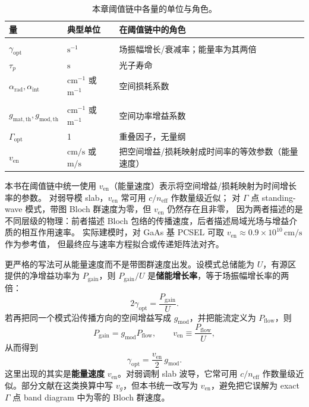 \begin{table}[htbp]
  \centering
  \small
  \caption{本章阈值链中各量的单位与角色。}
  \label{tab:threshold_units_bridge}
  \begin{tabular}{lll}
    \toprule
    量 & 典型单位 & 在阈值链中的角色 \\
    \midrule
    \shortstack[l]{$\gamma_{\mathrm{rad}},\gamma_{\mathrm{int}}$\\$\gamma_{\mathrm{opt}}$} & $\mathrm{s}^{-1}$ & 场振幅增长/衰减率；能量率为其两倍 \\
    $\tau_p$ & $\mathrm{s}$ & 光子寿命 \\
    $\alpha_{\mathrm{rad}},\alpha_{\mathrm{int}}$ & $\mathrm{cm}^{-1}$ 或 $\mathrm{m}^{-1}$ & 空间损耗系数 \\
    \shortstack[l]{$g_{\mathrm{mat}},g_{\mathrm{mod}}$\\$g_{\mathrm{mat,th}},g_{\mathrm{mod,th}}$} & $\mathrm{cm}^{-1}$ 或 $\mathrm{m}^{-1}$ & 空间功率增益系数 \\
    $\Gamma_{\mathrm{opt}}$ & 1 & 重叠因子，无量纲 \\
    $v_{\mathrm{en}}$ & $\mathrm{cm/s}$ 或 $\mathrm{m/s}$ & 把空间增益/损耗映射成时间率的等效参数（能量速度）\\
    \bottomrule
  \end{tabular}
\end{table}

\begin{RigorousBox}
本书在阈值链中统一使用 $v_{\mathrm{en}}$（能量速度）表示将空间增益/损耗映射为时间增长率的参数。
对弱导模 slab，$v_{\mathrm{en}}$ 常可用 $c/n_{\mathrm{eff}}$ 作数量级近似；
对 $\Gamma$ 点 standing-wave 模式，带图 Bloch 群速度为零，但 $v_{\mathrm{en}}$ 仍然存在且非零，
因为两者描述的是不同层级的物理：前者描述 Bloch 包络的传播速度，后者描述局域光场与增益介质的相互作用速率。
实际建模时，对 GaAs 基 PCSEL 可取 $v_{\mathrm{en}}\approx0.9\times10^{10}\,\mathrm{cm/s}$ 作为参考值，
但最终应与速率方程拟合或传递矩阵法对齐。
\end{RigorousBox}

更严格的写法可从能量速度而不是带图群速度出发。设模式总储能为
$U$，有源区提供的净增益功率为 $P_{\mathrm{gain}}$，则 $P_{\mathrm{gain}}/U$ 是\textbf{储能增长率}，等于场振幅增长率的两倍：
\begin{equation}
2\gamma_{\mathrm{opt}}=\frac{P_{\mathrm{gain}}}{U}.
\label{eq:energy_rate_def}
\end{equation}
若再把同一个模式沿传播方向的空间增益写成 $g_{\mathrm{mod}}$，并把能流定义为
$P_{\mathrm{flow}}$，则
\begin{equation}
P_{\mathrm{gain}} = g_{\mathrm{mod}} P_{\mathrm{flow}},
\qquad
v_{\mathrm{en}}\equiv \frac{P_{\mathrm{flow}}}{U},
\label{eq:energy_velocity_def}
\end{equation}
从而得到
\begin{equation}
\gamma_{\mathrm{opt}} = \frac{v_{\mathrm{en}}}{2}\, g_{\mathrm{mod}}.
\label{eq:gamma_from_energy_velocity}
\end{equation}
这里出现的其实是\textbf{能量速度} $v_{\mathrm{en}}$。对弱调制 slab 波导，它常可用
$c/n_{\mathrm{eff}}$ 作数量级近似。部分文献在这类换算中写 $v_g$，但本书统一改写为
$v_{\mathrm{en}}$，避免把它误解为 exact $\Gamma$ 点 band diagram 中为零的 Bloch 群速度。

